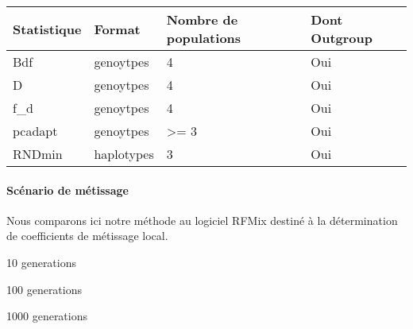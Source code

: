 \documentclass[12pt,twoside]{reedthesis}
\begin{document}
  \begin{tabular}{l|l|l|l}
  \hline
  Statistique & Format & Nombre de populations & Dont Outgroup\\
  \hline
  Bdf & genoytpes & 4 & Oui\\
  \hline
  D & genoytpes & 4 & Oui\\
  \hline
  f\_d & genoytpes & 4 & Oui\\
  \hline
  pcadapt & genoytpes & >= 3 & Oui\\
  \hline
  RNDmin & haplotypes & 3 & Oui\\
  \hline
  \end{tabular}
  
  \paragraph{Scénario de métissage}\label{scenario-de-metissage}
  
  Nous comparons ici notre méthode au logiciel RFMix destiné à la
  détermination de coefficients de métissage local.
  
  10 generations
  
  100 generations
  
  1000 generations
  
\end{document}
